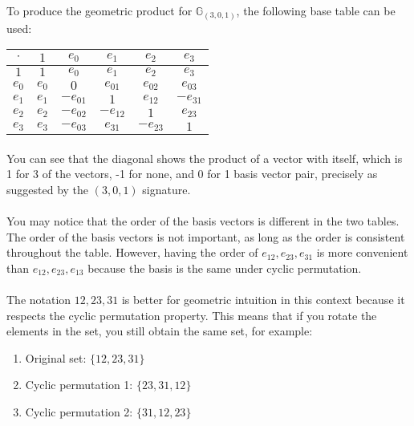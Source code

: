 \documentclass{article}
\newcommand{\mycaption}[2][nolabel]{%
  \ifthenelse{\equal{#1}{label}}{\refstepcounter{table}\caption{#2}\label{table:\thetable}}{\caption*{#2}}%
}
\begin{document}
\begin{enumerate}
    To produce the geometric product for $\mathbb{G}_{(3,0,1)}$, the following base table can be used:
    \begin{center}
    \begin{tabular}{|c|c|c|c|c|c|}
    \hline
    $\cdot$ & $1$ & $e_0$ & $e_1$ & $e_2$ & $e_3$ \\
    \hline
    $1$ & $1$ & $e_0$ & $e_1$ & $e_2$ & $e_3$ \\
    \hline
    $e_0$ & $e_0$ & $0$ & $e_{01}$ & $e_{02}$ & $e_{03}$ \\
    \hline
    $e_1$ & $e_1$ & $-e_{01}$ & $1$ & $e_{12}$ & $-e_{31}$ \\
    \hline
    $e_2$ & $e_2$ & $-e_{02}$ & $-e_{12}$ & $1$ & $e_{23}$ \\
    \hline
    $e_3$ & $e_3$ & $-e_{03}$ & $e_{31}$ & $-e_{23}$ & $1$ \\
    \hline
    \end{tabular}
    \end{center}

    \paragraph{}
        You can see that the diagonal shows the product of a vector with itself, which is 1 for 3 of the vectors,
        -1 for none, and 0 for 1 basis vector pair, precisely as suggested by the $(3,0,1)$ signature.

    \paragraph{}
        You may notice that the order of the basis vectors is different in the two tables. The order of the basis 
        vectors is not important,
        as long as the order is consistent throughout the table. However, having the order of ${e_{12}, e_{23}, e_{31}}$ is 
        more convenient than ${e_{12}, e_{23}, e_{13}}$ because the basis is the same under cyclic permutation.
    \paragraph{}
        The notation ${12, 23, 31}$ is better for geometric intuition in this context because it respects the cyclic 
        permutation property. This means that if you rotate the elements in the set, you still obtain the same set, for example:
        \begin{enumerate}
            \item Original set: $\{12, 23, 31\}$
            \item Cyclic permutation 1: $\{23, 31, 12\}$
            \item Cyclic permutation 2:  $\{31, 12, 23\}$
        \end{enumerate}

\end{enumerate}
\end{document}
